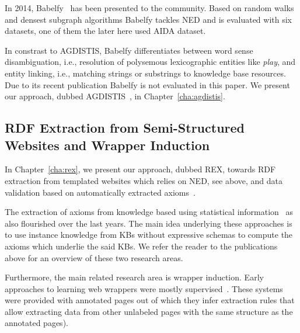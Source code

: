 In 2014, Babelfy~\cite{babelfy} has been presented to the community.
Based on random walks and densest subgraph algorithms Babelfy tackles \ac{NED} and is evaluated with six datasets, one of them the later here used AIDA dataset. 

In constrast to AGDISTIS, Babelfy differentiates between word sense disambiguation, i.e., resolution of polysemous lexicographic entities like \emph{play}, and entity linking, i.e., matching strings or substrings to knowledge base resources.
Due to its recent publication Babelfy is not evaluated in this paper.
We present our approach, dubbed AGDISTIS~\cite{agdistis_iswc}, in Chapter~\ref{cha:agdistis}. 



\subsection{RDF Extraction from Semi-Structured Websites and Wrapper Induction}

In Chapter~\ref{cha:rex}, we present our approach, dubbed REX, towards RDF extraction from templated websites which relies on \ac{NED}, see above, and data validation based on automatically extracted axioms~\cite{Buehmann2012}. 
\bigskip

The extraction of axioms from knowledge based using statistical information~\cite{Buehmann2012,pattern_enrichment} as also flourished over the last years. 
The main idea underlying these approaches is to use instance knowledge from  \ac{KB}s without expressive schemas to compute the axioms which underlie the said  \ac{KB}s. 
We refer the reader to the publications above for an overview of these two research areas.
\bigskip

Furthermore, the main related research area is wrapper induction. 
Early approaches to learning web wrappers were mostly supervised~\cite{flesca2004web,Hogue:2005:TAU:1060745.1060762}. 
These systems were provided with annotated pages out of which they infer extraction rules that allow extracting data from other unlabeled pages with the same structure as the annotated pages). 

